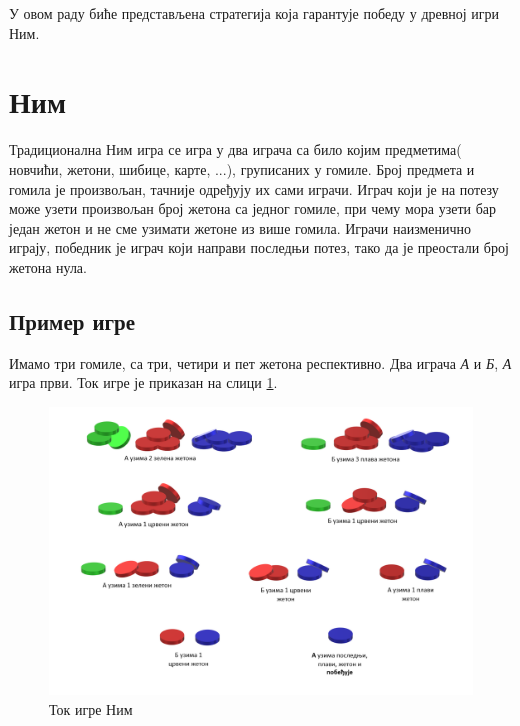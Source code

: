 \documentclass[a4paper]{article}
\begin{document}
У овом раду биће представљена стратегија која гарантује победу у древној игри Ним.

\section{Ним}

Традиционална Ним игра се игра у два играча са било којим предметима( новчићи, жетони, шибице, карте, ...), груписаних у гомиле. Број предмета и гомила је произвољан, тачније одређују их сами играчи. Играч који је на потезу може узети произвољан број жетона са једног гомиле, при чему мора узети бар један жетон и не сме узимати жетоне из више гомила. Играчи наизменично играју, победник је играч који направи последњи потез, тако да је преостали број жетона нула.

\subsection{Пример игре}

Имамо три гомиле, са три, четири и пет жетона респективно. Два играча \textit{А} и \textit{Б}, \textit{А} игра први. Ток игре је приказан на слици \ref{fig:nimPrimer}.

\begin{figure}[H]
	\caption{Ток игре Ним}
	\label{fig:nimPrimer}
	\begin{center}
		\includegraphics[width=\textwidth]{NimPrimer.png}
	\end{center}
\end{figure}
\end{document}
